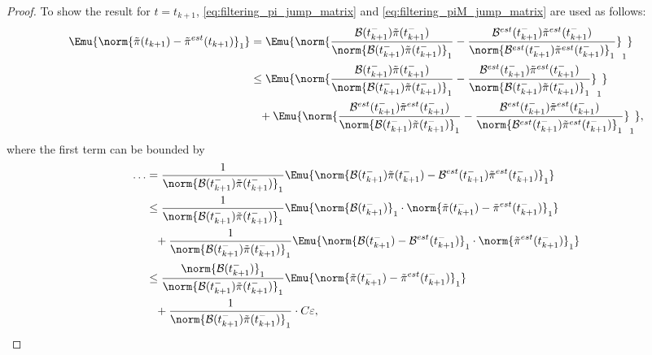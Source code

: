 \begin{proof}
To show the result for $t = t_{k+1}$, \eqref{eq:filtering_pi_jump_matrix} and \eqref{eq:filtering_piM_jump_matrix} are used as follows:
\begin{equation}
\label{eq:FMP_error_decomp_jump}
\begin{aligned}
    \Emu{\norm{\Tilde{\pi}(t_{k+1}) - \Tilde{\pi}^{est}(t_{k+1})}_1} &= \Emu{\norm{ \frac{\mathcal{B}(t_{k+1}^-) \Tilde{\pi}(t_{k+1}^-)}{\norm{\mathcal{B}(t_{k+1}^-) \Tilde{\pi}(t_{k+1}^-)}_1} - \frac{\mathcal{B}^{est}(t_{k+1}^-) \Tilde{\pi}^{est}(t_{k+1}^-)}{\norm{\mathcal{B}^{est}(t_{k+1}^-) \Tilde{\pi}^{est}(t_{k+1}^-)}_1} }_1} \\
    &\leq \Emu{\norm{ \frac{\mathcal{B}(t_{k+1}^-) \Tilde{\pi}(t_{k+1}^-)}{\norm{\mathcal{B}(t_{k+1}^-) \Tilde{\pi}(t_{k+1}^-)}_1} - \frac{\mathcal{B}^{est}(t_{k+1}^-) \Tilde{\pi}^{est}(t_{k+1}^-)}{\norm{\mathcal{B}(t_{k+1}^-) \Tilde{\pi}(t_{k+1}^-)}_1} }_1} \\
    &\phantom{\leq} + \Emu{\norm{ \frac{\mathcal{B}^{est}(t_{k+1}^-) \Tilde{\pi}^{est}(t_{k+1}^-)}{\norm{\mathcal{B}(t_{k+1}^-) \Tilde{\pi}(t_{k+1}^-)}_1} - \frac{\mathcal{B}^{est}(t_{k+1}^-) \Tilde{\pi}^{est}(t_{k+1}^-)}{\norm{\mathcal{B}^{est}(t_{k+1}^-) \Tilde{\pi}^{est}(t_{k+1}^-)}_1} }_1}, \\
\end{aligned}
\end{equation}
where the first term can be bounded by
\begin{align*}
    \dots &= \frac{1}{\norm{\mathcal{B}(t_{k+1}^-) \Tilde{\pi}(t_{k+1}^-)}_1} \Emu{\norm{ \mathcal{B}(t_{k+1}^-) \Tilde{\pi}(t_{k+1}^-) - \mathcal{B}^{est}(t_{k+1}^-) \Tilde{\pi}^{est}(t_{k+1}^-)  }_1 } \\
    &\leq \frac{1}{\norm{\mathcal{B}(t_{k+1}^-) \Tilde{\pi}(t_{k+1}^-)}_1} \Emu{\norm{\mathcal{B}(t_{k+1}^-)}_1 \cdot \norm{ \Tilde{\pi}(t_{k+1}^-) - \Tilde{\pi}^{est}(t_{k+1}^-) }_1 } \\
    &\phantom{\leq} + \frac{1}{\norm{\mathcal{B}(t_{k+1}^-) \Tilde{\pi}(t_{k+1}^-)}_1} \Emu{\norm{ \mathcal{B}(t_{k+1}^-) - \mathcal{B}^{est}(t_{k+1}^-)}_1 \cdot \norm{\Tilde{\pi}^{est}(t_{k+1}^-) }_1 } \\
    &\leq \frac{\norm{\mathcal{B}(t_{k+1}^-)}_1}{\norm{\mathcal{B}(t_{k+1}^-) \Tilde{\pi}(t_{k+1}^-)}_1} \Emu{ \norm{ \Tilde{\pi}(t_{k+1}^-) - \Tilde{\pi}^{est}(t_{k+1}^-) }_1 } \\
    &\phantom{\leq} + \frac{1}{\norm{\mathcal{B}(t_{k+1}^-) \Tilde{\pi}(t_{k+1}^-)}_1} \cdot C \varepsilon,
\end{align*}

\end{proof}
